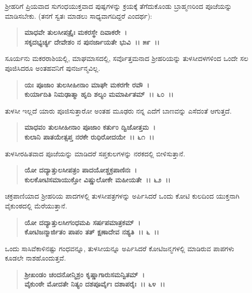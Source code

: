 ಶ‍್ರೀಹರಿಗೆ ಪ್ರಿಯವಾದ ಸುಗಂಧಯುಕ್ತವಾದ ಪುಷ್ಪಗಳನ್ನು ಕ್ರಯಕ್ಕೆ ತೆಗೆದುಕೊಂಡು ಬ್ರಾಹ್ಮಣರಿಂದ ಪೂಜೆಯನ್ನು ಮಾಡಿಸಬೇಕು. (ತನಗೆ ಸ್ವತಃ ಮಾಡಲು ಸಾಧ್ಯವಾಗದಿದ್ದರೆ ಎಂದರ್ಥ):

\begin{verse}
\textbf{ಮಾಧವೇ ತುಲಸೀಪತ್ರೈಃ ಮಕರಸ್ಥೇ ದಿವಾಕರೇ~।}\\\textbf{ಸಕೃದಭ್ಯರ್ಚ್ಯ ದೇವೇಶಂ ನ ಪುನರ್ಜಾಯತೇ ಭುವಿ~।। ೫೯~।।}
\end{verse}

ಸೂರ್ಯನು ಮಕರರಾಶಿಯಲ್ಲಿ, ಮಾಘಮಾಸದಲ್ಲಿ, ಸರ್ವೊತ್ತಮನಾದ ಶ‍್ರೀಹರಿಯನ್ನು ತುಳಸೀದಳಗಳಿಂದ ಒಂದೇ ಸಲ ಪೂಜಿಸಿದರೂ ಅಂತಹವನಿಗೆ ಪುನರ್ಜನ್ಮವಿಲ್ಲ.

\begin{verse}
\textbf{ಯಃ ಪೂಜಾಂ ತುಲಸೀಹೀನಾಂ ಮಾಘೇ ಮಕರಗೇ ರವೌ~।}\\\textbf{ಕುರ್ಯಾದಿತಿ ನಿಮಢಾತ್ಮಾ ಹೃದಿ ಶಲ್ಯಂ ಮಮಾರ್ಪಿತಮ್~।। ೬೦~।।}
\end{verse}

ತುಳಸೀ ಇಲ್ಲದೆ ಯಾರು ಪೂಜಿಸುತ್ತಾರೋ ಅಂತಹ ಮೂಢರು ನನ್ನ ಎದೆಗೆ ಬಾಣವನ್ನು ಎಸೆದಂತೆ ಆಗುತ್ತದೆ.

\begin{verse}
\textbf{ಮಾಧವಂ ತುಲಸೀಹೀನಾಂ ಪೂಜಾಂ ಕರ್ತುಂ ದ್ವಿಜೋತ್ತಮ~।}\\\textbf{ಕುಲಾನಿ ಪಾತಯೇತ್ಸಪ್ತ ನರಕೇ ರುಧಿರೋದಯೇ~।। ೬೧~।।}
\end{verse}

ತುಳಸೀರಹಿತವಾದ ಪೂಜೆಯನ್ನು ಮಾಡಿದರೆ ಸಪ್ತಕುಲಗಳನ್ನು ನರಕದಲ್ಲಿ ಬೀಳಿಸುತ್ತಾನೆ.

\begin{verse}
\textbf{ಯೋ ದದ್ಯಾತ್ತುಲಸೀಪತ್ರಂ ಪಾದಯೋಶ್ಚಕ್ರಪಾಣಿನಃ~।}\\\textbf{ಕುಲಕೋಟಿಸಮಾಯುಕ್ತೋ ವಿಷ್ಣುಲೋಕೇ ಮಹೀಯತೇ~।। ೬೨~।। }
\end{verse}

ಚಕ್ರಪಾಣಿಯಾದ ಶ‍್ರೀಹರಿಯ ಪಾದಗಳಲ್ಲಿ ತುಳಸೀಪತ್ರಗಳನ್ನು ಅರ್ಪಿಸಿದರೆ ಒಂದು ಕೋಟಿ ಕುಲದಿಂದ ಯುಕ್ತನಾಗಿ ವೈಕುಂಠದಲ್ಲಿ ಮೆರೆಯುತ್ತಾನೆ.

\begin{verse}
\textbf{ಯೋ ದದ್ಯಾತ್ತುಲಸೀಗಂಧಮಪಿ ಸರ್ಷಪಮಾತ್ರಕಮ್~।}\\\textbf{ಕೋಟಿಜನ್ಮಾರ್ಜಿತಂ ಪಾಪಂ ತತ್ ಕ್ಷಣಾದೇವ ನಶ್ಯತಿ~।। ೬~।।}
\end{verse}

ಒಂದು ಸಾಸಿವೆಕಾಳಿನಷ್ಟು ಗಂಧವನ್ನೂ, ತುಳಸೀಯನ್ನೂ ಅರ್ಪಿಸಿದರೆ ಕೋಟಿಜನ್ಮಗಳಲ್ಲಿ ಮಾಡಿರುವ ಪಾಪಗಳು ಕೂಡಲೇ ನಾಶಹೊಂದುತ್ತವೆ.

\begin{verse}
\textbf{ಶ‍್ರೀಖಂಡಂ ಚಂದನೋನ್ಮಿಶ್ರಂ ಕೃಷ್ಣಾಗಾರುಸಮನ್ವಿತಮ್~।}\\\textbf{ವೈಕುಂಠೇ ಮೋದತೇ ನಿತ್ಯಂ ದಶಪೂರ್ವೈಃ ದಶಾಪರೈಃ~।। ೬೪~।।}
\end{verse}

